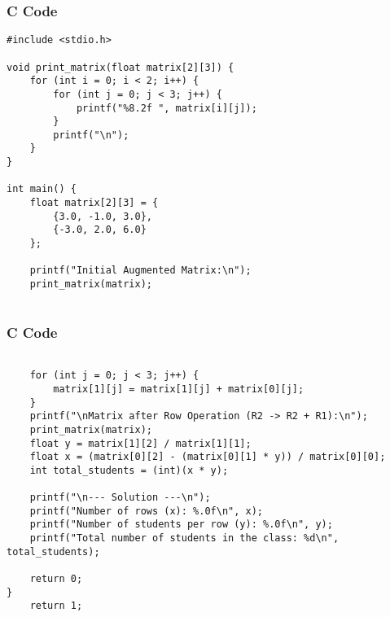 \documentclass{beamer}
\begin{document}
\begin{frame}[fragile]
    \frametitle{C Code }

    \begin{lstlisting}
#include <stdio.h>

void print_matrix(float matrix[2][3]) {
    for (int i = 0; i < 2; i++) {
        for (int j = 0; j < 3; j++) {
            printf("%8.2f ", matrix[i][j]);
        }
        printf("\n");
    }
}

int main() {
    float matrix[2][3] = {
        {3.0, -1.0, 3.0},
        {-3.0, 2.0, 6.0}
    };

    printf("Initial Augmented Matrix:\n");
    print_matrix(matrix);


    \end{lstlisting}
\end{frame}

\begin{frame}[fragile]
    \frametitle{C Code }
    \begin{lstlisting}
    
    for (int j = 0; j < 3; j++) {
        matrix[1][j] = matrix[1][j] + matrix[0][j];
    }
    printf("\nMatrix after Row Operation (R2 -> R2 + R1):\n");
    print_matrix(matrix);
    float y = matrix[1][2] / matrix[1][1];
    float x = (matrix[0][2] - (matrix[0][1] * y)) / matrix[0][0];
    int total_students = (int)(x * y);

    printf("\n--- Solution ---\n");
    printf("Number of rows (x): %.0f\n", x);
    printf("Number of students per row (y): %.0f\n", y);
    printf("Total number of students in the class: %d\n", total_students);

    return 0;
}
    return 1;
\end{lstlisting}
\end{frame}
\end{document}

